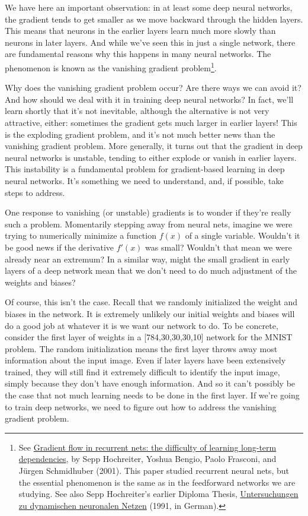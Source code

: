 \documentclass[a4paper,twoside,10pt]{book}
\begin{document}
We have here an important observation: in at least some deep neural networks, the gradient tends to get smaller as we move backward through the hidden layers. This means that neurons in the earlier layers learn much more slowly than neurons in later layers. And while we've seen this in just a single network, there are fundamental reasons why this happens in many neural networks. The phenomenon is known as the vanishing gradient problem\footnote{See \href{http://citeseerx.ist.psu.edu/viewdoc/summary?doi=10.1.1.24.7321}{Gradient flow in recurrent nets: the difficulty of learning long-term dependencies}, by Sepp Hochreiter, Yoshua Bengio, Paolo Frasconi, and J\"urgen Schmidhuber (2001). This paper studied recurrent neural nets, but the essential phenomenon is the same as in the feedforward networks we are studying. See also Sepp Hochreiter's earlier Diploma Thesis, \href{http://www.idsia.ch/~juergen/SeppHochreiter1991ThesisAdvisorSchmidhuber.pdf}{Untersuchungen zu dynamischen neuronalen Netzen} (1991, in German).}.

Why does the vanishing gradient problem occur? Are there ways we can avoid it? And how should we deal with it in training deep neural networks? In fact, we'll learn shortly that it's not inevitable, although the alternative is not very attractive, either: sometimes the gradient gets much larger in earlier layers! This is the exploding gradient problem, and it's not much better news than the vanishing gradient problem. More generally, it turns out that the gradient in deep neural networks is unstable, tending to either explode or vanish in earlier layers. This instability is a fundamental problem for gradient-based learning in deep neural networks. It's something we need to understand, and, if possible, take steps to address.

One response to vanishing (or unstable) gradients is to wonder if they're really such a problem. Momentarily stepping away from neural nets, imagine we were trying to numerically minimize a function $f(x)$ of a single variable. Wouldn't it be good news if the derivative $f'(x)$ was small? Wouldn't that mean we were already near an extremum? In a similar way, might the small gradient in early layers of a deep network mean that we don't need to do much adjustment of the weights and biases?

Of course, this isn't the case. Recall that we randomly initialized the weight and biases in the network. It is extremely unlikely our initial weights and biases will do a good job at whatever it is we want our network to do. To be concrete, consider the first layer of weights in a [784,30,30,30,10] network for the MNIST problem. The random initialization means the first layer throws away most information about the input image. Even if later layers have been extensively trained, they will still find it extremely difficult to identify the input image, simply because they don't have enough information. And so it can't possibly be the case that not much learning needs to be done in the first layer. If we're going to train deep networks, we need to figure out how to address the vanishing gradient problem.
\end{document}
